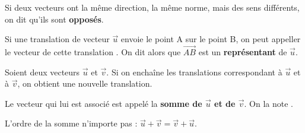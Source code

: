\documentclass[
	classe=$2^{de}$,
	headerTitle=Généralités\space sur\space les\space vecteurs
]{coursclass}
\begin{document}
\begin{definition}
	Si deux vecteurs ont la même direction, la même norme, mais des sens différents, on dit qu'ils sont \textbf{opposés}.
\end{definition}

\begin{vocabulaire}
	\begin{center}
	\end{center}

	Si une translation de vecteur $\vec{u}$ envoie le point A sur le point B, on peut appeller le vecteur de cette translation . On dit alors que $\vec{AB}$ est un \textbf{représentant} de $\vec{u}$.
\end{vocabulaire}

\begin{definition}
	Soient deux vecteurs $\vec{u}$ et $\vec{v}$. Si on enchaîne les translations correspondant à $\vec{u}$ et à $\vec{v}$, on obtient une nouvelle translation.

	Le vecteur qui lui est associé est appelé la \textbf{somme de $\vec{u}$ et de $\vec{v}$}. On la note .
\end{definition}

\begin{exemple}
	\begin{center}
	\end{center}
\end{exemple}

\begin{remarque}
	L'ordre de la somme n'importe pas : $\vec{u} + \vec{v} = \vec{v} + \vec{u}$.

	\begin{center}
	\end{center}
\end{remarque}
\end{document}
